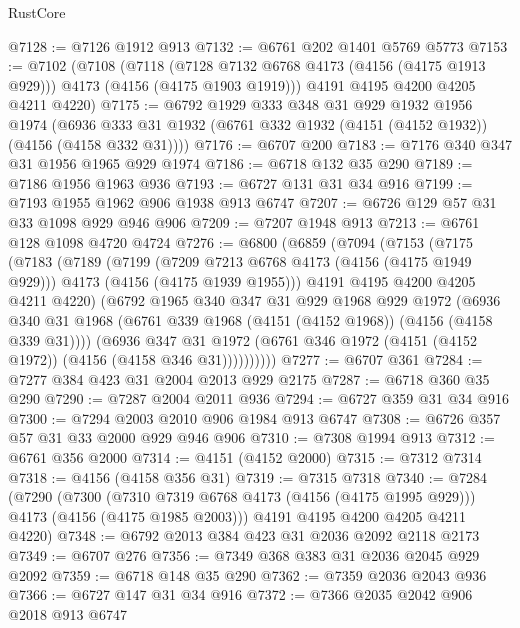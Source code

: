 \begin{lexlean}{RustCore}
\begin{coremodule}
@7128 := @7126 @1912 @913
@7132 := @6761 @202 @1401 @5769 @5773
@7153 := @7102
    (@7108
      (@7118 (@7128 @7132 @6768 @4173 (@4156 (@4175 @1913 @929))) @4173 (@4156 (@4175 @1903 @1919)))
      @4191
      @4195
      @4200
      @4205
      @4211
      @4220)
@7175 := @6792
    @1929
    @333
    @348
    @31
    @929
    @1932
    @1956
    @1974
    (@6936 @333 @31 @1932 (@6761 @332 @1932 (@4151 (@4152 @1932)) (@4156 (@4158 @332 @31))))
@7176 := @6707 @200
@7183 := @7176 @340 @347 @31 @1956 @1965 @929 @1974
@7186 := @6718 @132 @35 @290
@7189 := @7186 @1956 @1963 @936
@7193 := @6727 @131 @31 @34 @916
@7199 := @7193 @1955 @1962 @906 @1938 @913 @6747
@7207 := @6726 @129 @57 @31 @33 @1098 @929 @946 @906
@7209 := @7207 @1948 @913
@7213 := @6761 @128 @1098 @4720 @4724
@7276 := @6800
    (@6859
      (@7094
        (@7153
          (@7175
            (@7183
              (@7189
                (@7199
                  (@7209 @7213 @6768 @4173 (@4156 (@4175 @1949 @929)))
                  @4173
                  (@4156 (@4175 @1939 @1955)))
                @4191
                @4195
                @4200
                @4205
                @4211
                @4220)
              (@6792
                @1965
                @340
                @347
                @31
                @929
                @1968
                @929
                @1972
                (@6936
                  @340
                  @31
                  @1968
                  (@6761 @339 @1968 (@4151 (@4152 @1968)) (@4156 (@4158 @339 @31))))
                (@6936
                  @347
                  @31
                  @1972
                  (@6761 @346 @1972 (@4151 (@4152 @1972)) (@4156 (@4158 @346 @31))))))))))
@7277 := @6707 @361
@7284 := @7277 @384 @423 @31 @2004 @2013 @929 @2175
@7287 := @6718 @360 @35 @290
@7290 := @7287 @2004 @2011 @936
@7294 := @6727 @359 @31 @34 @916
@7300 := @7294 @2003 @2010 @906 @1984 @913 @6747
@7308 := @6726 @357 @57 @31 @33 @2000 @929 @946 @906
@7310 := @7308 @1994 @913
@7312 := @6761 @356 @2000
@7314 := @4151 (@4152 @2000)
@7315 := @7312 @7314
@7318 := @4156 (@4158 @356 @31)
@7319 := @7315 @7318
@7340 := @7284
    (@7290
      (@7300 (@7310 @7319 @6768 @4173 (@4156 (@4175 @1995 @929))) @4173 (@4156 (@4175 @1985 @2003)))
      @4191
      @4195
      @4200
      @4205
      @4211
      @4220)
@7348 := @6792 @2013 @384 @423 @31 @2036 @2092 @2118 @2173
@7349 := @6707 @276
@7356 := @7349 @368 @383 @31 @2036 @2045 @929 @2092
@7359 := @6718 @148 @35 @290
@7362 := @7359 @2036 @2043 @936
@7366 := @6727 @147 @31 @34 @916
@7372 := @7366 @2035 @2042 @906 @2018 @913 @6747

\end{coremodule}
\end{lexlean}
